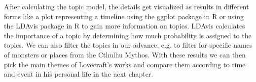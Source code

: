 After calculating the topic model, the details get visualized as results in different forms like a plot 
representing a timeline using the ggplot package in R or using the LDAvis package in R to gain more 
information on topics. LDAvis calculates the importance of a topic by determining how much probability 
is assigned to the topics. We can also filter the topics in our advance, e.g. to filter for specific 
names of monsters or places from the Cthulhu Mythos. With these results we can then pick the main themes 
of Lovecraft’s works and compare them according to time and event in his personal life in the next chapter.
